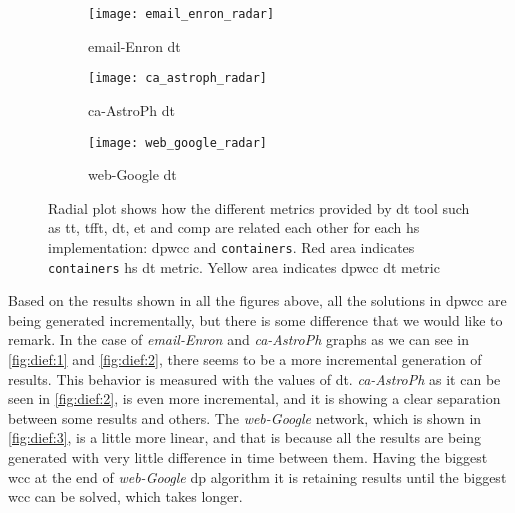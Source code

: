 \begin{figure}[!htb]
  \centering
  \begin{subfigure}{0.33\textwidth}
   \texttt{[image: email\_enron\_radar]}
    \caption[{[PoC] \acrshort{dt} Results: email-Enron radar}]{email-Enron \acrshort{dt}}
    \label{fig:dief:rad:1}
  \end{subfigure}%
  \begin{subfigure}{0.33\textwidth}
   \texttt{[image: ca\_astroph\_radar]}
    \caption[{[PoC] \acrshort{dt} Results: ca-AstroPh radar}]{ca-AstroPh \acrshort{dt}}
    \label{fig:dief:rad:2}
  \end{subfigure}%
  \begin{subfigure}{0.33\textwidth}
   \texttt{[image: web\_google\_radar]}
    \caption[{[PoC] \acrshort{dt} Results: web-Google radar}]{web-Google \acrshort{dt}}
    \label{fig:dief:rad:3}
  \end{subfigure}
  \caption[{[PoC] \acrshort{dt} Metrics (Radial)}]{Radial plot shows how the different metrics provided by \acrshort{dt} tool such as \acrshort{tt}, \acrshort{tfft}, \acrshort{dt}, \acrshort{et} and \acrshort{comp} are related each other for each \acrshort{hs} implementation: \acrshort{dpwcc} and \texttt{containers}. Red area indicates \texttt{containers} \acrshort{hs} \acrshort{dt} metric. Yellow area indicates \acrshort{dpwcc} \acrshort{dt} metric}
\end{figure}

Based on the results shown in all the figures above, all the solutions in \acrshort{dpwcc} are being generated incrementally, 
but there is some difference that we would like to remark. In the case of \emph{email-Enron} and \emph{ca-AstroPh} graphs 
as we can see in \autoref{fig:dief:1} and \autoref{fig:dief:2}, there seems to be a more incremental generation of results. 
This behavior is measured with the values of \acrlong{dt}. \emph{ca-AstroPh} as it can be seen in \autoref{fig:dief:2}, is even more incremental, and it is showing a clear separation between some results and others. 
The \emph{web-Google} network, which is shown in \autoref{fig:dief:3}, is a little more linear, and that is because all the results are being generated with very little difference in time between them. 
Having the biggest \acrshort{wcc} at the end of \emph{web-Google} \acrshort{dp} algorithm 
it is retaining results until the biggest \acrshort{wcc} can be solved, which takes longer. 


